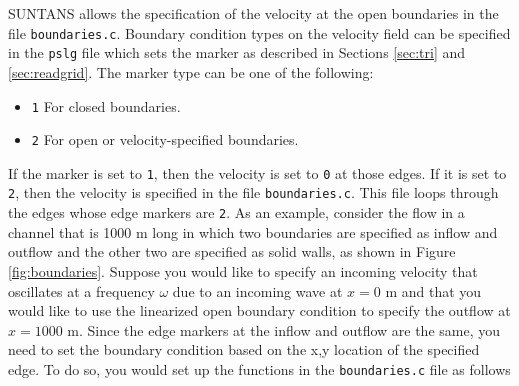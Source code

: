 \documentclass[12pt,oneside]{article}
\begin{document}
SUNTANS allows the specification of the velocity at the open boundaries in the file
\verb+boundaries.c+.  Boundary condition types on the velocity field can be specified in the \verb+pslg+ file
which sets the marker as described in Sections \ref{sec:tri} and \ref{sec:readgrid}.  The marker type
can be one of the following:
\begin{itemize}
\item \verb+1+ For closed boundaries.
\item \verb+2+ For open or velocity-specified boundaries.
\end{itemize}
If the marker is set to \verb+1+, then the velocity is set to \verb+0+ at those edges.  If it is set to \verb+2+,
then the velocity is specified in the file \verb+boundaries.c+.  This file loops through the edges whose edge
markers are \verb+2+.  As an example, consider the flow in a channel that is 1000 m long in which two boundaries
are specified as inflow and outflow and the other two are specified as solid walls, as shown in Figure 
\ref{fig:boundaries}.  
Suppose you would like to
specify an incoming velocity that oscillates at a frequency $\omega$ due to an incoming wave at $x=0$ m and that
you would like to use the linearized open boundary condition to specify the outflow at $x=1000$ m.  Since the
edge markers at the inflow and outflow are the same, you need to set the boundary condition based on the x,y
location of the specified edge.  To do so, you would set up the functions in the \verb+boundaries.c+ file as follows
\end{document}
